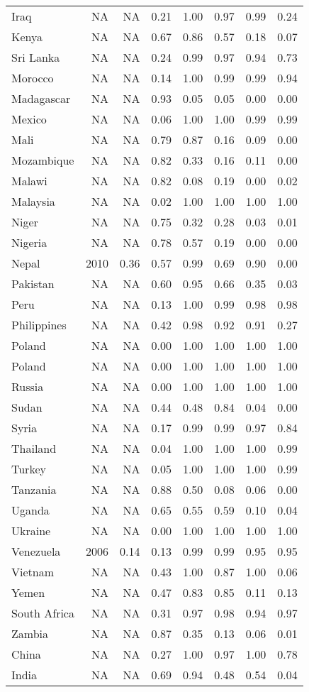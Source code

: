 \begin{longtable}[t]{lrrrrrrr}
Iraq & NA & NA & 0.21 & 1.00 & 0.97 & 0.99 & 0.24\\
Kenya & NA & NA & 0.67 & 0.86 & 0.57 & 0.18 & 0.07\\
Sri Lanka & NA & NA & 0.24 & 0.99 & 0.97 & 0.94 & 0.73\\
Morocco & NA & NA & 0.14 & 1.00 & 0.99 & 0.99 & 0.94\\
Madagascar & NA & NA & 0.93 & 0.05 & 0.05 & 0.00 & 0.00\\
Mexico & NA & NA & 0.06 & 1.00 & 1.00 & 0.99 & 0.99\\
Mali & NA & NA & 0.79 & 0.87 & 0.16 & 0.09 & 0.00\\
Mozambique & NA & NA & 0.82 & 0.33 & 0.16 & 0.11 & 0.00\\
Malawi & NA & NA & 0.82 & 0.08 & 0.19 & 0.00 & 0.02\\
Malaysia & NA & NA & 0.02 & 1.00 & 1.00 & 1.00 & 1.00\\
Niger & NA & NA & 0.75 & 0.32 & 0.28 & 0.03 & 0.01\\
Nigeria & NA & NA & 0.78 & 0.57 & 0.19 & 0.00 & 0.00\\
Nepal & 2010 & 0.36 & 0.57 & 0.99 & 0.69 & 0.90 & 0.00\\
Pakistan & NA & NA & 0.60 & 0.95 & 0.66 & 0.35 & 0.03\\
Peru & NA & NA & 0.13 & 1.00 & 0.99 & 0.98 & 0.98\\
Philippines & NA & NA & 0.42 & 0.98 & 0.92 & 0.91 & 0.27\\
Poland & NA & NA & 0.00 & 1.00 & 1.00 & 1.00 & 1.00\\
Poland & NA & NA & 0.00 & 1.00 & 1.00 & 1.00 & 1.00\\
Russia & NA & NA & 0.00 & 1.00 & 1.00 & 1.00 & 1.00\\
Sudan & NA & NA & 0.44 & 0.48 & 0.84 & 0.04 & 0.00\\
Syria & NA & NA & 0.17 & 0.99 & 0.99 & 0.97 & 0.84\\
Thailand & NA & NA & 0.04 & 1.00 & 1.00 & 1.00 & 0.99\\
Turkey & NA & NA & 0.05 & 1.00 & 1.00 & 1.00 & 0.99\\
Tanzania & NA & NA & 0.88 & 0.50 & 0.08 & 0.06 & 0.00\\
Uganda & NA & NA & 0.65 & 0.55 & 0.59 & 0.10 & 0.04\\
Ukraine & NA & NA & 0.00 & 1.00 & 1.00 & 1.00 & 1.00\\
Venezuela & 2006 & 0.14 & 0.13 & 0.99 & 0.99 & 0.95 & 0.95\\
Vietnam & NA & NA & 0.43 & 1.00 & 0.87 & 1.00 & 0.06\\
Yemen & NA & NA & 0.47 & 0.83 & 0.85 & 0.11 & 0.13\\
South Africa & NA & NA & 0.31 & 0.97 & 0.98 & 0.94 & 0.97\\
Zambia & NA & NA & 0.87 & 0.35 & 0.13 & 0.06 & 0.01\\
China & NA & NA & 0.27 & 1.00 & 0.97 & 1.00 & 0.78\\
India & NA & NA & 0.69 & 0.94 & 0.48 & 0.54 & 0.04\\
\bottomrule
\end{longtable}